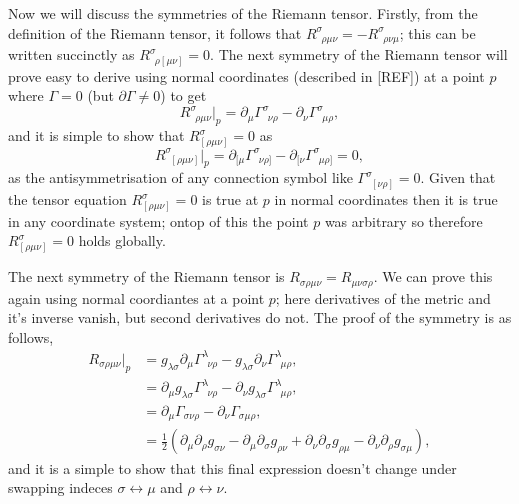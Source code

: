 Now we will discuss the symmetries of the Riemann tensor. Firstly, from the definition of the Riemann tensor, it follows that $R^\sigma_{\,\,\,\rho \mu\nu} = -R^\sigma_{\,\,\,\rho\nu\mu}$; this can be written succinctly as $R^\sigma_{\,\,\,\rho[\mu\nu]}=0$. The next symmetry of the Riemann tensor will prove easy to derive using normal coordinates (described in [REF]) at a point $p$ where $\Gamma=0$ (but $\partial \Gamma\neq 0$) to get
\begin{equation}
R^\sigma_{\,\,\,\rho\mu\nu}\big|_{p} = \partial_\mu \Gamma^\sigma_{\,\,\,\nu\rho}  - \partial_\nu \Gamma^\sigma_{\,\,\,\mu\rho},
\end{equation}
and it is simple to show that $R^\sigma_{[\rho\mu\nu]}=0$ as
\begin{equation}
R^\sigma_{\,\,\,[\rho\mu\nu]}\big|_{p} = \partial_{[\mu} \Gamma^\sigma_{\,\,\,\nu\rho]}  - \partial_{[\nu} \Gamma^\sigma_{\,\,\,\mu\rho]}=0,
\end{equation}
as the antisymmetrisation of any connection symbol like $\Gamma^\sigma_{\,\,\,[\nu\rho]}=0$. Given that the tensor equation $R^\sigma_{[\rho\mu\nu]}=0$ is true at $p$ in normal coordinates then it is true in any coordinate system; ontop of this the point $p$ was arbitrary so therefore $R^\sigma_{[\rho\mu\nu]}=0$ holds globally.

The next symmetry of the Riemann tensor is $R_{\sigma\rho\mu\nu} = R_{\mu\nu\sigma\rho}$. We can prove this again using normal coordiantes at a point $p$; here derivatives of the metric and it's inverse vanish, but second derivatives do not. The proof of the symmetry is as follows,
\begin{align}
R_{\sigma\rho\mu\nu}\big|_p &= g_{\lambda\sigma}\partial_\mu \Gamma^\lambda_{\,\,\,\nu\rho}  - g_{\lambda\sigma}\partial_\nu \Gamma^\lambda_{\,\,\,\mu\rho} , \\
&= \partial_\mu g_{\lambda\sigma} \Gamma^\lambda_{\,\,\,\nu\rho}  - \partial_\nu g_{\lambda\sigma} \Gamma^\lambda_{\,\,\,\mu\rho} , \\
&= \partial_\mu \Gamma_{\sigma\nu\rho}  - \partial_\nu  \Gamma_{\sigma\mu\rho} , \\
&= \frac{1}{2}\left(\partial_{\mu} \partial_\rho g_{\sigma\nu} - \partial_{\mu} \partial_\sigma g_{\rho\nu} + \partial_{\nu} \partial_\sigma g_{\rho\mu} - \partial_{\nu} \partial_\rho g_{\sigma\mu}\right),
\end{align}
and it is a simple to show that this final expression doesn't change under swapping indeces $\sigma\leftrightarrow\mu$ and $\rho\leftrightarrow\nu$.

